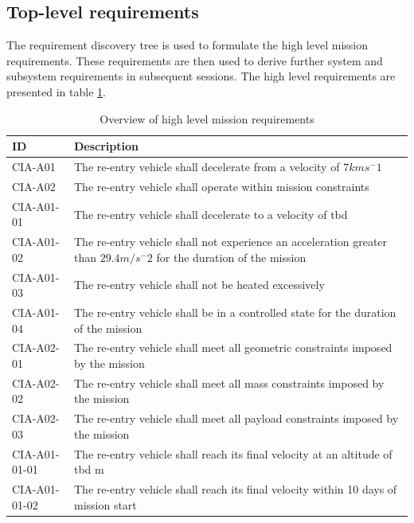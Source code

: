 \subsection{Top-level requirements}
The requirement discovery tree is used to formulate the high level mission requirements. These requirements are then used to derive further system and subsystem requirements in subsequent sessions. The high level requirements are presented in table \ref{tab:toplevelreq}.

\begin{table}[H]
	\caption{Overview of high level mission requirements} \label{tab:toplevelreq}
	\begin{tabular}{|p{}|p{}|}
    \hline
    ID          & Description    \\ \hline \hline
    CIA-A01 & The re-entry vehicle shall decelerate from a velocity of $7kms^-1$ \\ \hline
    CIA-A02 & The re-entry vehicle shall operate within mission constraints     \\ \hline
    CIA-A01-01 & The re-entry vehicle shall decelerate to a velocity of \gls{tbd}     \\ \hline
    CIA-A01-02 & The re-entry vehicle shall not experience an acceleration greater than $29.4 m/s^-2$ for the duration of the mission\\ \hline
    CIA-A01-03 & The re-entry vehicle shall not be heated excessively  \\ \hline
    CIA-A01-04 & The re-entry vehicle shall be in a controlled state for the duration of the mission \\ \hline
    CIA-A02-01 & The re-entry vehicle shall meet all geometric constraints imposed by the mission \\ \hline
    CIA-A02-02 & The re-entry vehicle shall meet all mass constraints imposed by the mission \\ \hline
	CIA-A02-03 & The re-entry vehicle shall meet all payload constraints imposed by the mission \\ \hline
	CIA-A01-01-01 & The re-entry vehicle shall reach its final velocity at an altitude of \gls{tbd} m \\ \hline
	CIA-A01-01-02 & The re-entry vehicle shall reach its final velocity within 10 days of mission start \\ \hline
    \end{tabular}
\end{table}












